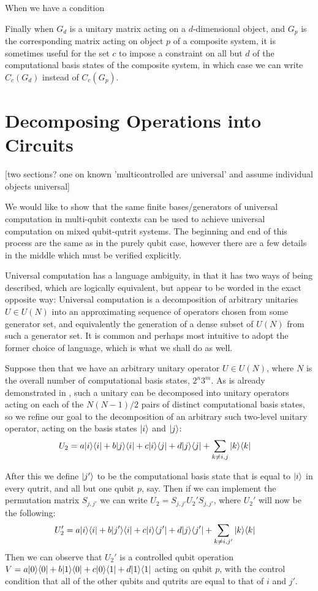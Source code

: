 When we have a condition 

Finally when $G_d$ is a unitary matrix acting on a $d$-dimensional object, and $G_p$ is the corresponding matrix acting on object $p$ of a composite system, it is sometimes useful for the set $c$ to impose a constraint on all but $d$ of the computational basis states of the composite system, in which case we can write $C_c(G_d)$ instead of $C_c(G_p)$.
\section{Decomposing Operations into Circuits}
[two sections? one on known 'multicontrolled are universal' and assume individual objects universal]

We would like to show that the same finite bases/generators of universal computation in multi-qubit contexts can be used to achieve universal computation on mixed qubit-qutrit systems. The beginning and end of this process are the same as in the purely qubit case, however there are a few details in the middle which  must be verified explicitly.

Universal computation has a language ambiguity, in that it has two ways of being described, which are logically equivalent, but appear to be worded in the exact opposite way: Universal computation is a decomposition of arbitrary unitaries $U \in U(N)$ into an approximating sequence of operators chosen from some generator set, and equivalently the generation of a dense subset of $U(N)$ from such a generator set. It is common and perhaps most intuitive to adopt the former choice of language, which is what we shall do as well.

Suppose then that we have an arbitrary unitary operator $U \in U(N)$, where $N$ is the overall number of computational basis states, $2^n3^m$. As is already demonstrated in \cite{textbook}, such a unitary can be decomposed into unitary operators acting on each of the $N(N-1)/2$ pairs of distinct computational basis states, so we refine our goal to the decomposition of an arbitrary such two-level unitary operator, acting on the basis states $| i \rangle$ and $| j \rangle$:
\begin{align*}
U_2 &= a| i \rangle\langle i | + b| j \rangle\langle i | + c| i \rangle\langle j | + d| j \rangle\langle j | + \sum_{k \neq i, j} | k \rangle\langle k |
\end{align*}

After this we define $| j' \rangle$ to be the computational basis state that is equal to $| i \rangle$ in every qutrit, and all but one qubit $p$, say. Then if we can implement the permutation matrix $S_{j,j'}$ we can write $U_2 = S_{j,j'}U_2'S_{j,j'}$, where $U_2'$ will now be the following:
\begin{align*}
U_2' &= a| i \rangle\langle i | + b| j' \rangle\langle i | + c| i \rangle\langle j' | + d| j \rangle\langle j' | + \sum_{k \neq i, j'} | k \rangle\langle k |
\end{align*}
Then we can observe that $U_2'$ is a controlled qubit operation $V = a| 0 \rangle\langle 0 | + b| 1 \rangle\langle 0 | + c| 0 \rangle\langle 1 | + d| 1 \rangle\langle 1 |$ acting on qubit $p$, with the control condition that all of the other qubits and qutrits are equal to that of $i$ and $j'$.

